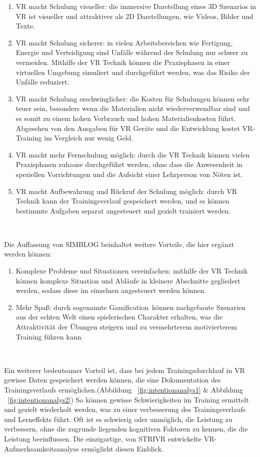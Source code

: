 \begin{enumerate}
\item VR macht Schulung visueller: die immersive Darstellung eines 3D Szenarios in VR ist visueller und attraktiver als 2D Darstellungen, wie Videos, Bilder und Texte.
\item VR macht Schulung sicherer: in vielen Arbeitsbereichen wie Fertigung, Energie und Verteidigung sind Unfälle während der Schulung nur schwer zu vermeiden. Mithilfe der VR Technik können die Praxisphasen in einer virtuellen Umgebung simuliert und durchgeführt werden, was das Risiko der Unfälle reduziert.
\item VR macht Schulung erschwinglicher: die Kosten für Schulungen können sehr teuer sein, besonders wenn die Materialien nicht wiederverwendbar sind und es somit zu einem hohen Verbrauch und hohen Materialienkosten führt. Abgesehen von den Ausgaben für VR Geräte und die Entwicklung kostet VR-Training im Vergleich nur wenig Geld.
\item VR macht mehr Fernschulung möglich: durch die VR Technik können vielen Praxisphasen zuhause durchgeführt werden, ohne dass die Anwesenheit in speziellen Vorrichtungen und die Aufsicht einer Lehrperson von Nöten ist.
\item VR macht Aufbewahrung und Rückruf der Schulung möglich: durch VR Technik kann der Trainingsverlauf gespeichert werden, und es können bestimmte Aufgaben separat angesteuert und gezielt trainiert werden.
\end{enumerate}\

Die Auffassung von SIMBLOG \citep{16} beinhaltet weitere Vorteile, die hier ergänzt werden können:

\begin{enumerate}
\item Komplexe Probleme und Situationen vereinfachen: mithilfe der VR Technik können komplexe Situation und Abläufe in kleinere Abschnitte gegliedert werden, sodass diese im einzelnen angesteuert werden können.
\item Mehr Spaß: durch sogenannte \glqq Gamification\grqq\ können nachgebaute Szenarien aus der echten Welt einen spielerischen Charakter erhalten, was die Attraktivität der Übungen steigern und zu vermehrterem motivierterem Training führen kann.
\end{enumerate}\

Ein weiterer bedeutsamer Vorteil ist, dass bei jedem Trainingsdurchlauf in VR gewisse Daten gespeichert werden können, die eine Dokumentation des Trainingsverlaufs ermöglichen.(Abbildung ~\ref{fig:intentionanalys1} \& Abbildung ~\ref{fig:intentionanalys2}) So können gewisse Schwierigkeiten im Training ermittelt und gezielt wiederholt werden, was zu einer verbesserung des Trainingsverlaufs und Lerneffekts führt. \glqq Oft ist es schwierig oder unmöglich, die Leistung zu verbessern, ohne die zugrunde liegenden kognitiven Faktoren zu kennen, die die Leistung beeinflussen. Die einzigartige, von STRIVR entwickelte VR-Aufmerksamkeitsanalyse ermöglicht diesen Einblick.\grqq\ \citep{18}

